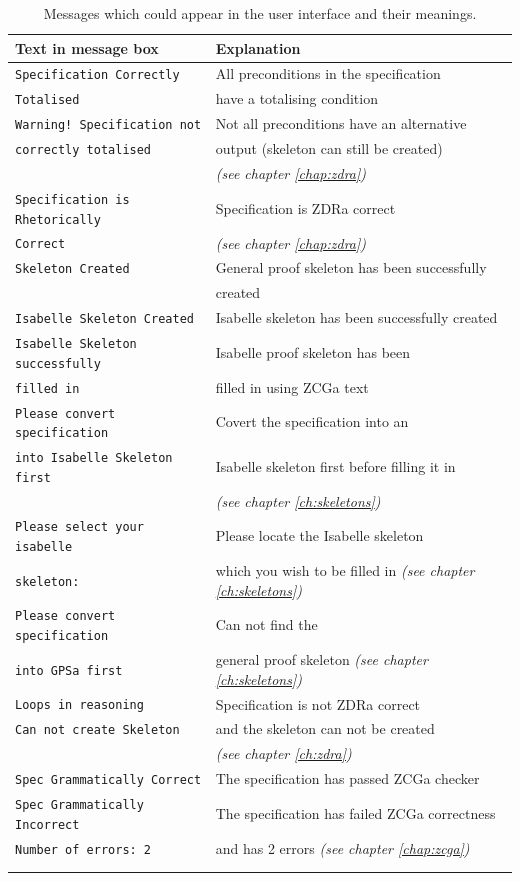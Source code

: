 {\def\arraystretch{0.5}\tabcolsep=0.5pt
\begin{longtable}[H]{|l | l |}
\hline
\textbf{Text in message box} & \textbf{Explanation} \\
\hline
\hline
\verb|Specification Correctly| & All preconditions in the specification\\
\verb|Totalised| & have a totalising condition  \\
\hline
\verb|Warning! Specification not| & Not all preconditions have an alternative \\
\verb|correctly totalised| & output (skeleton can still be created) \\
& \textit{(see chapter \ref{chap:zdra})} \\
\hline
\verb|Specification is Rhetorically| & Specification is ZDRa correct \\
\verb|Correct| & \textit{(see chapter \ref{chap:zdra})} \\
\hline
\verb|Skeleton Created| & General proof skeleton has been successfully \\
& created \\
\hline
\verb|Isabelle Skeleton Created| & Isabelle skeleton has been successfully
created \\
\hline
\verb|Isabelle Skeleton successfully| & Isabelle proof skeleton has been \\
\verb|filled in| & filled in using ZCGa text \\
\hline
\verb|Please convert specification| & Covert the specification into an  \\
\verb|into Isabelle Skeleton first| & Isabelle skeleton first before filling it
in \\
& \textit{(see chapter \ref{ch:skeletons})} \\
\hline
\verb|Please select your isabelle| & Please locate the Isabelle skeleton\\
\verb|skeleton:| & which you wish to be filled in \textit{(see chapter
\ref{ch:skeletons})}\\
\hline
\verb|Please convert specification| & Can not find the \\
\verb|into GPSa first| & general proof skeleton \textit{(see chapter
\ref{ch:skeletons})}\\
\hline
\verb|Loops in reasoning| & Specification is not ZDRa correct \\
\verb|Can not create Skeleton| & and the skeleton can not be created \\
& \textit{(see chapter \ref{ch:zdra})}\\
\hline
\verb|Spec Grammatically Correct| & The specification has passed ZCGa checker \\
\hline
\verb|Spec Grammatically Incorrect|& The specification has failed ZCGa
correctness\\
\verb|Number of errors: 2| & and has 2 errors \textit{(see chapter
\ref{chap:zcga})}\\
\hline 

\\ \caption{Messages which could appear in the user interface and their meanings.}
\label{tab:uimessages}
\end{longtable}
}

